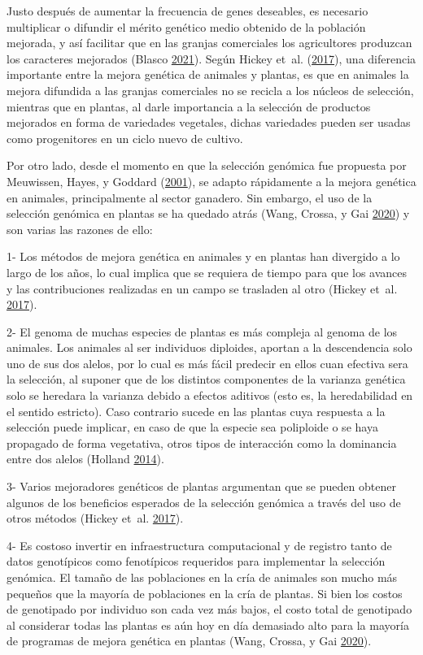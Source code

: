 \documentclass[11pt,spanish,a4paper,oneside,]{book} %
\begin{document}
Justo después de aumentar la frecuencia de genes deseables, es necesario multiplicar o difundir el mérito genético medio obtenido de la población mejorada, y así facilitar que en las granjas comerciales los agricultores produzcan los caracteres mejorados (Blasco \protect\hyperlink{ref-cite:21}{2021}). Según Hickey et~al. (\protect\hyperlink{ref-cite:44}{2017}), una diferencia importante entre la mejora genética de animales y plantas, es que en animales la mejora difundida a las granjas comerciales no se recicla a los núcleos de selección, mientras que en plantas, al darle importancia a la selección de productos mejorados en forma de variedades vegetales, dichas variedades pueden ser usadas como progenitores en un ciclo nuevo de cultivo.

Por otro lado, desde el momento en que la selección genómica fue propuesta por Meuwissen, Hayes, y Goddard (\protect\hyperlink{ref-cite:8}{2001}), se adapto rápidamente a la mejora genética en animales, principalmente al sector ganadero. Sin embargo, el uso de la selección genómica en plantas se ha quedado atrás (Wang, Crossa, y Gai \protect\hyperlink{ref-cite:46}{2020}) y son varias las razones de ello:

1- Los métodos de mejora genética en animales y en plantas han divergido a lo largo de los años, lo cual implica que se requiera de tiempo para que los avances y las contribuciones realizadas en un campo se trasladen al otro (Hickey et~al. \protect\hyperlink{ref-cite:44}{2017}).

2- El genoma de muchas especies de plantas es más compleja al genoma de los animales. Los animales al ser individuos diploides, aportan a la descendencia solo uno de sus dos alelos, por lo cual es más fácil predecir en ellos cuan efectiva sera la selección, al suponer que de los distintos componentes de la varianza genética solo se heredara la varianza debido a efectos aditivos (esto es, la heredabilidad en el sentido estricto). Caso contrario sucede en las plantas cuya respuesta a la selección puede implicar, en caso de que la especie sea poliploide o se haya propagado de forma vegetativa, otros tipos de interacción como la dominancia entre dos alelos (Holland \protect\hyperlink{ref-cite:43}{2014}).

3- Varios mejoradores genéticos de plantas argumentan que se pueden obtener algunos de los beneficios esperados de la selección genómica a través del uso de otros métodos (Hickey et~al. \protect\hyperlink{ref-cite:44}{2017}).

4- Es costoso invertir en infraestructura computacional y de registro tanto de datos genotípicos como fenotípicos requeridos para implementar la selección genómica. El tamaño de las poblaciones en la cría de animales son mucho más pequeños que la mayoría de poblaciones en la cría de plantas. Si bien los costos de genotipado por individuo son cada vez más bajos, el costo total de genotipado al considerar todas las plantas es aún hoy en día demasiado alto para la mayoría de programas de mejora genética en plantas (Wang, Crossa, y Gai \protect\hyperlink{ref-cite:46}{2020}).
\end{document}
